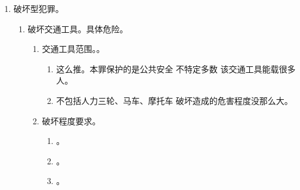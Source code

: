 \begin{enumerate}
\begin{enumerate}
\begin{enumerate}
\begin{enumerate}
                          \item {}。
                          \item {}。
                        \end{enumerate}
                  \item 危险的样态。。
                  \item 危险的程度。达到放火、决水、爆炸的危险程度。
                        \begin{enumerate}
                          \item {}。
                          \item {}。
                          \item {}。
                        \end{enumerate}
                \end{enumerate}
        \end{enumerate}
  \item 破坏型犯罪。
        \begin{enumerate}
          \item 破坏交通工具。具体危险。
                \begin{enumerate}
                  \item 交通工具范围。。
                        \begin{enumerate}
                          \item 这么推。本罪保护的是公共安全 \yjt 不特定多数 \yjt 该交通工具能载很多人。
                          \item 不包括人力三轮、马车、摩托车 \yjt 破坏造成的危害程度没那么大。
                        \end{enumerate}
                  \item 破坏程度要求。
                        \begin{enumerate}
                          \item {}。
                          \item {}。
                          \item {}。
                        \end{enumerate}
                \end{enumerate}

\end{enumerate}
\end{enumerate}
